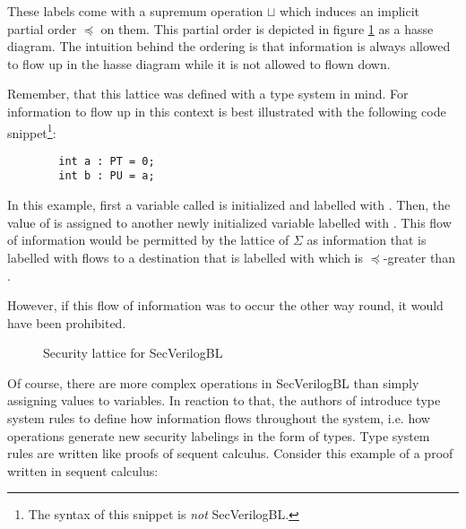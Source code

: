 These labels come with a supremum operation $ \sqcup $ which induces an implicit partial order $ \preceq $ on them.
This partial order is depicted in figure \ref{fig:sec-lattice} as a hasse diagram.
The intuition behind the ordering is that information is always allowed to flow up in the hasse diagram while it is not allowed to flown down.

\begin{example}
    Remember, that this lattice was defined with a type system in mind.
    For information to flow up in this context is best illustrated with the following code snippet\footnote{%
        The syntax of this snippet is \textit{not} SecVerilogBL.%
    }:
    \begin{lstlisting}
        int a : PT = 0;
        int b : PU = a;
    \end{lstlisting}

    In this example, first a variable called  is initialized and labelled with \PT{}.
    Then, the value of  is assigned to another newly initialized variable labelled with \PU{}.
    This flow of information would be permitted by the lattice of $ \Sigma $ as information that is labelled with \PT{} flows to a destination that is labelled with \PU{} which is $ \preceq $-greater than \PT{}.

    However, if this flow of information was to occur the other way round, it would have been prohibited.
\end{example}

\begin{figure}
    \centering
    \caption{Security lattice for SecVerilogBL \cite{Ferraiuolo17}}
    \label{fig:sec-lattice}
\end{figure}

Of course, there are more complex operations in SecVerilogBL than simply assigning values to variables.
In reaction to that, the authors of \cite{Ferraiuolo17} introduce type system rules to define how information flows throughout the system, i.e. how operations generate new security labelings in the form of types.
Type system rules are written like proofs of sequent calculus.
Consider this example of a proof written in sequent calculus:
\begin{prooftree}
\end{prooftree}


